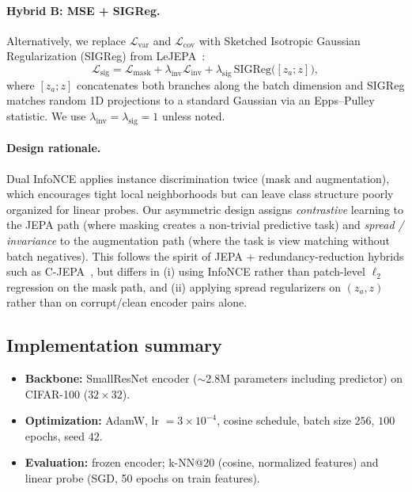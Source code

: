 \paragraph{Hybrid B: MSE + SIGReg.}
Alternatively, we replace $\mathcal{L}_{\mathrm{var}}$ and
$\mathcal{L}_{\mathrm{cov}}$ with Sketched Isotropic Gaussian Regularization
(SIGReg) from LeJEPA~\cite{balestriero2025lejepa}:
\begin{equation}
  \mathcal{L}_{\mathrm{sig}}
  = \mathcal{L}_{\mathrm{mask}}
  + \lambda_{\mathrm{inv}} \mathcal{L}_{\mathrm{inv}}
  + \lambda_{\mathrm{sig}} \,\mathrm{SIGReg}\big([z_a; z]\big),
\end{equation}
where $[z_a; z]$ concatenates both branches along the batch dimension and
SIGReg matches random 1D projections to a standard Gaussian via an
Epps--Pulley statistic.
We use $\lambda_{\mathrm{inv}} = \lambda_{\mathrm{sig}} = 1$ unless noted.

\paragraph{Design rationale.}
Dual InfoNCE applies instance discrimination twice (mask and augmentation),
which encourages tight local neighborhoods but can leave class structure
poorly organized for linear probes.
Our asymmetric design assigns \emph{contrastive} learning to the JEPA path
(where masking creates a non-trivial predictive task) and \emph{spread /
invariance} to the augmentation path (where the task is view matching without
batch negatives).
This follows the spirit of JEPA + redundancy-reduction hybrids such as
C-JEPA~\cite{mo2024cjepa}, but differs in (i) using InfoNCE rather than
patch-level $\ell_2$ regression on the mask path, and (ii) applying spread
regularizers on $(z_a, z)$ rather than on corrupt/clean encoder pairs alone.

\subsection{Implementation summary}
\label{sec:implementation}

\begin{itemize}
  \item \textbf{Backbone:} SmallResNet encoder ($\sim$2.8M parameters including
        predictor) on CIFAR-100 ($32{\times}32$).
  \item \textbf{Optimization:} AdamW, lr $= 3{\times}10^{-4}$, cosine schedule,
        batch size $256$, $100$ epochs, seed $42$.
  \item \textbf{Evaluation:} frozen encoder; k-NN@20 (cosine, normalized
        features) and linear probe (SGD, 50 epochs on train features).
\end{itemize}
